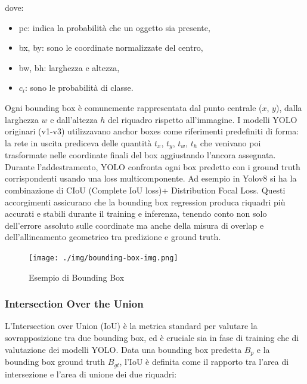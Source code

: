 \documentclass[12pt]{article}
\begin{document}
dove: 
\begin{itemize}
\item pc:  indica la probabilità che un oggetto sia presente, 
\item bx, by: sono le coordinate normalizzate del centro,
\item bw, bh: larghezza e altezza,
\item $c_i$: sono le probabilità di classe.
\end{itemize}
Ogni bounding box è comunemente rappresentata dal punto centrale ($x$, $y$), dalla larghezza $w$ e dall’altezza $h$ del riquadro rispetto all’immagine. I modelli YOLO originari (v1-v3) utilizzavano anchor boxes come riferimenti predefiniti di forma: la rete in uscita prediceva delle quantità $t_x$, $t_y$, $t_w$, $t_h$ che venivano poi trasformate nelle coordinate finali del box aggiustando l’ancora assegnata.\\ 
Durante l’addestramento, YOLO confronta ogni box predetto con i ground truth corrispondenti usando una loss multicomponente. Ad esempio in Yolov8 si ha la combinazione di CIoU (Complete IoU loss)+ Distribution Focal Loss.
Questi accorgimenti assicurano che la bounding box regression produca riquadri più accurati e stabili durante il training e inferenza, tenendo conto non solo dell’errore assoluto sulle coordinate ma anche della misura di overlap e dell’allineamento geometrico tra predizione e ground truth.

\begin{figure}[H]
    \centering
    \texttt{[image: ./img/bounding-box-img.png]}
    \caption{Esempio di Bounding Box}
    \label{fig:bounding-box-example}
\end{figure}


\subsubsection{Intersection Over the Union}

L’Intersection over Union (IoU) è la metrica standard per valutare la sovrapposizione tra due bounding box, ed è cruciale sia in fase di training che di valutazione dei modelli YOLO. Data una bounding box predetta $B_p$ e la bounding box ground truth $B_{gt}$, l’IoU è definita come il rapporto tra l’area di intersezione e l’area di unione dei due riquadri:
\end{document}
